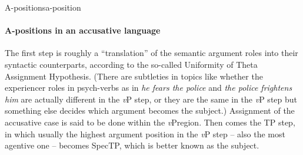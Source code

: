 \documentclass[a4paper, oneside]{report}
\newcommand{\form}[1]{\emph{#1}}
\newcommand{\vP}{\textit{v}P}
\begin{document}
\begin{theorybox}{A-positions}{a-position}
    \paragraph*{A-positions in an accusative language} 
    The first step is roughly a ``translation'' of the semantic argument roles 
    into their syntactic counterparts,
    according to the so-called Uniformity of Theta Assignment Hypothesis.
    (There are subtleties in topics like whether 
    the experiencer roles in psych-verbs as in 
    \form{he fears the police} and \form{the police frightens him}
    are actually different in the \vP{} step,
    or they are the same in the \vP{} step but something else decides 
    which argument becomes the subject.)
    Assignment of the accusative case is said to be done within the \vP region.
    Then comes the TP step, in which
    usually the highest argument position in the \vP{} step -- also the most agentive one --
    becomes SpecTP, 
    which is better known as the subject.


\end{theorybox}
\end{document}
